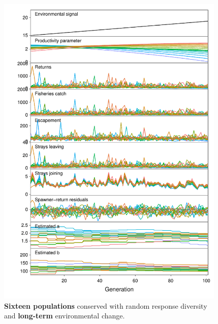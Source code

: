 \begin{figure}[htbp]
\centering
\includegraphics[width=4.3in]{metafolio/n-linear-sim-16}
\caption{\textbf{Sixteen populations} conserved with random response diversity
and \textbf{long-term} environmental change.}
\label{f:eg-n-linear-sixteen}
\end{figure}

\clearpage

